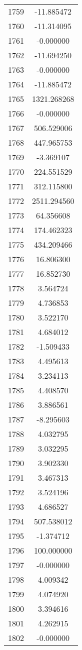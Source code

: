 \documentclass[12pt]{article}
\begin{document}
\begin{longtable}{@{}cc@{}}
1759 & -11.885472 \\
1760 & -11.314095 \\
1761 & -0.000000 \\
1762 & -11.694250 \\
1763 & -0.000000 \\
1764 & -11.885472 \\
1765 & 1321.268268 \\
1766 & -0.000000 \\
1767 & 506.529006 \\
1768 & 447.965753 \\
1769 & -3.369107 \\
1770 & 224.551529 \\
1771 & 312.115800 \\
1772 & 2511.294560 \\
1773 & 64.356608 \\
1774 & 174.462323 \\
1775 & 434.209466 \\
1776 & 16.806300 \\
1777 & 16.852730 \\
1778 & 3.564724 \\
1779 & 4.736853 \\
1780 & 3.522170 \\
1781 & 4.684012 \\
1782 & -1.509433 \\
1783 & 4.495613 \\
1784 & 3.234113 \\
1785 & 4.408570 \\
1786 & 3.886561 \\
1787 & -8.295603 \\
1788 & 4.032795 \\
1789 & 3.032295 \\
1790 & 3.902330 \\
1791 & 3.467313 \\
1792 & 3.524196 \\
1793 & 4.686527 \\
1794 & 507.538012 \\
1795 & -1.374712 \\
1796 & 100.000000 \\
1797 & -0.000000 \\
1798 & 4.009342 \\
1799 & 4.074920 \\
1800 & 3.394616 \\
1801 & 4.262915 \\
1802 & -0.000000 \\

\end{longtable}
\end{document}
